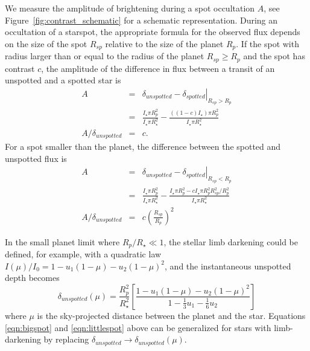 \begin{subappendices}
We measure the amplitude of brightening during a spot occultation $A$, see Figure~\ref{fig:contrast_schematic} for a schematic representation. During an occultation of a starspot, the appropriate formula for the observed flux depends on the size of the spot $R_{sp}$ relative to the size of the planet $R_{p}$. If the spot with radius larger than or equal to the radius of the planet $R_{sp} \ge R_p$ and the spot has contrast $c$, the amplitude of the difference in flux between a transit of an unspotted and a spotted star is
\begin{eqnarray}
 A &=& \left. \delta_{unspotted} - \delta_{spotted} \right|_{R_{sp} > R_p} \\
 &=& \frac{I_\star \pi R_p^2}{I_\star \pi R_\star^2} - \frac{((1 - c)I_\star) \pi R_p^2}{ I_\star \pi R_\star^2}\\
A/\delta_{unspotted} &=&  c. \label{eqn:bigspot}
\end{eqnarray}
For a spot smaller than the planet, the difference between the spotted and unspotted flux is
\begin{eqnarray}
 A &=& \left. \delta_{unspotted} - \delta_{spotted} \right|_{R_{sp} < R_p} \\
 &=& \frac{I_\star \pi R_p^2}{I_\star \pi R_\star^2} - \frac{I_\star \pi R_p^2 - c I_\star \pi R_p^2 R_{sp}^2/R_p^2}{ I_\star \pi R_\star^2}\\
 A/\delta_{unspotted} &=&  c \left(\frac{R_{sp}}{R_p}\right)^2
 \label{eqn:littlespot}
\end{eqnarray}

In the small planet limit where $R_p/R_\star \ll 1$, the stellar limb darkening could be defined, for example, with a quadratic law $I(\mu)/I_0 = 1 - u_1(1-\mu) - u_2(1-\mu)^2$, and the instantaneous unspotted depth becomes 
\begin{equation}
\delta_{unspotted}(\mu) =  \frac{R_p^2}{R_\star^2} \left[ \frac{1 - u_1(1-\mu) - u_2(1-\mu)^2}{1 - \frac{1}{3}u_1 - \frac{1}{6}u_2} \right]
\end{equation}
where $\mu$ is the sky-projected distance between the planet and the star. Equations \ref{eqn:bigspot} and \ref{eqn:littlespot} above can be generalized for stars with limb-darkening by replacing $\delta_{unspotted} \rightarrow \delta_{unspotted}(\mu)$.

\end{subappendices}

%
%

% 

